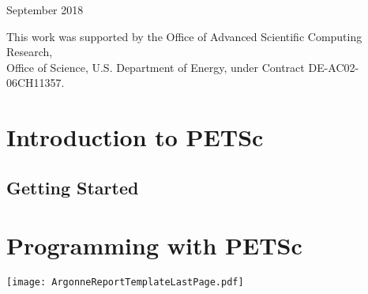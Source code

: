 \vspace*{30pt}
\noindent September 2018

\vspace*{20pt}
\noindent This work was supported by the Office of Advanced Scientific Computing Research, \\
Office of Science, U.S. Department of Energy, under Contract DE-AC02-06CH11357.


\cleardoublepage
\pagestyle{fancy}
\vspace{1in}
\date{\today}



\cleardoublepage



\medskip \medskip



\cleardoublepage
\label{tableofcontents}
\tableofcontents

\cleardoublepage
\part{Introduction to PETSc}
\label{part_intro}
\cleardoublepage
\chapter{Getting Started}


\cleardoublepage
\part{Programming with PETSc}
\label{part_usage}


\cleardoublepage




\cleardoublepage

\addtocounter{chapter}{1}
\label{sec:bib}


\pagestyle{empty}
\begin{figure*}[hbt]
\centerline{\texttt{[image: ArgonneReportTemplateLastPage.pdf]}}
\caption{}
\end{figure*}
\restoregeometry



